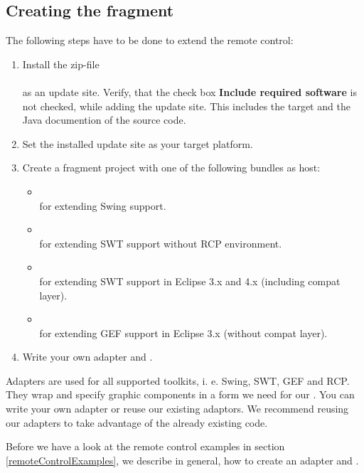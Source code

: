 \subsection{Creating the fragment}

The following steps have to be done to extend the \app{} remote control:

\begin{enumerate}
  \item Install the zip-file\\
        \\
        as an update site. Verify, that the check box \textbf{Include required
        software} is not checked, while adding the update site. This includes
        the target and the Java documention of the source code.
  \item Set the installed update site as your target platform.
  \item Create a fragment project with one of the following bundles as host:
    \begin{itemize}
      \item {}\\
            for extending Swing support.
      \item {}\\
            for extending SWT support without RCP environment.
      \item {}\\
            for extending SWT support in Eclipse 3.x and 4.x (including compat
            layer).
      \item {}\\
            for extending GEF support in Eclipse 3.x (without compat
            layer).
   \end{itemize}
  \item Write your own adapter and \gdtesterclasses.
\end{enumerate}

Adapters are used for all supported toolkits, i. e. Swing, SWT, GEF and RCP.
They wrap and specify graphic components in a form we need for our
\gdtesterclasses. You can write your own adapter or reuse our existing
adaptors. We recommend reusing our adapters to take advantage of the already
existing code.

Before we have a look at the \app{} remote control examples in section
\ref{remoteControlExamples}, we describe in general, how to create an
adapter and \gdtesterclasses.

